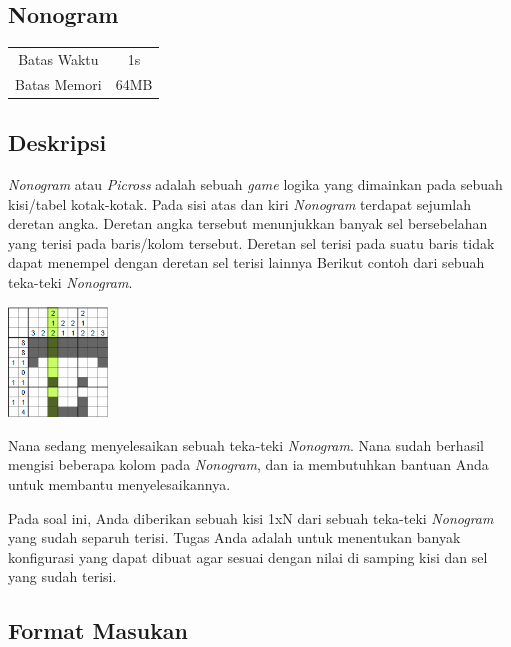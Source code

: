 \documentclass{article}
\begin{document}
\begin{center}
    \section*{Nonogram} %

    \begin{tabular}{ | c c | }
        \hline
        Batas Waktu  & 1s \\    %
        Batas Memori & 64MB \\  %
        \hline
    \end{tabular}
\end{center}

\subsection*{Deskripsi}

\textit{Nonogram} atau \textit{Picross} adalah sebuah \textit{game} logika yang dimainkan pada sebuah kisi/tabel kotak-kotak.
Pada sisi atas dan kiri \textit{Nonogram} terdapat sejumlah deretan angka.
Deretan angka tersebut menunjukkan banyak sel bersebelahan yang terisi pada baris/kolom tersebut.
Deretan sel terisi pada suatu baris tidak dapat menempel dengan deretan sel terisi lainnya
Berikut contoh dari sebuah teka-teki \textit{Nonogram}.

\includegraphics[width=100px]{Homogram-Steve}

Nana sedang menyelesaikan sebuah teka-teki \textit{Nonogram}. 
Nana sudah berhasil mengisi beberapa kolom pada \textit{Nonogram}, dan ia membutuhkan bantuan Anda untuk membantu menyelesaikannya.

Pada soal ini, Anda diberikan sebuah kisi 1xN dari sebuah teka-teki \textit{Nonogram} yang sudah separuh terisi.
Tugas Anda adalah untuk menentukan banyak konfigurasi yang dapat dibuat agar sesuai dengan nilai di samping kisi dan sel yang sudah terisi.

\subsection*{Format Masukan}
\end{document}
